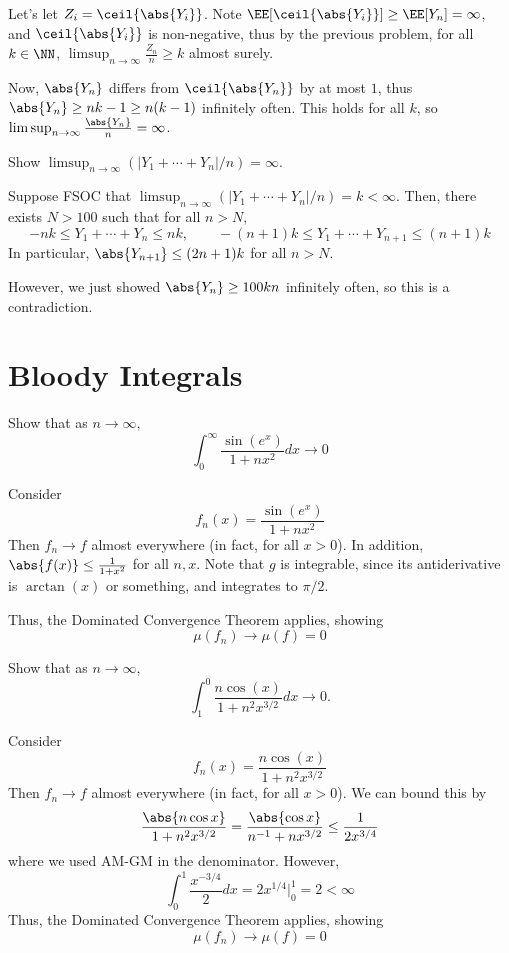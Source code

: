 \documentclass[11pt, headheight=30pt]{scrartcl}
\begin{document}
Let's let $Z_i = \ceil{\abs{Y_i}}$. Note $\EE[\ceil{\abs{Y_i}}] \geq \EE[Y_n] = \infty$,
and $\ceil{\abs{Y_i}}$ is non-negative, thus by the previous problem,
for all $k\in \NN$,
$\limsup_{n\to \infty} \frac{Z_n}{n} \geq k$
almost surely.

Now, $\abs{Y_n}$ differs from $\ceil{\abs{Y_n}}$
by at most $1$, thus $\abs{Y_n}\geq nk - 1\geq n(k-1)$ infinitely often.
This holds for all $k$, so $\limsup_{n\to \infty} \frac{\abs{Y_n}}{n} = \infty$.

\begin{prob}
    Show $\limsup_{n \to \infty}(|Y_1 + \cdots + Y_n|/n) = \infty$.
\end{prob}

Suppose FSOC that $\limsup_{n \to \infty}(|Y_1 + \cdots + Y_n|/n) = k < \infty$.
Then, there exists $N > 100$ such that for all $n > N$,
\[
    -nk \leq Y_1 + \cdots + Y_n \leq nk,\qquad -(n+1)k \leq Y_1 + \cdots + Y_{n+1} \leq (n+1)k
\]
In particular, $\abs{Y_{n+1}} \leq (2n + 1)k$ for all $n > N$.

However, we just showed $\abs{Y_n}\geq 100kn$ infinitely often,
so this is a contradiction.

\section{Bloody Integrals}
\begin{prob}
    Show that as $n \to \infty$,
    \[
        \int_0^\infty \frac{\sin(e^x)}{1 + nx^2}dx \to 0
    \]
\end{prob}

Consider
\[
    f_n(x) = \frac{\sin(e^x)}{1 + nx^2}
\]
Then $f_n\to f$ almost everywhere (in fact, for all $x > 0$).
In addition, $\abs{f(x)} \leq \frac{1}{1 + x^2}$ for all $n,x$.
Note that $g$ is integrable, since its antiderivative
is $\arctan(x)$ or something, and integrates to $\pi/2$.

Thus, the Dominated Convergence Theorem applies, showing
\[
    \mu(f_n) \to \mu(f) = 0    
\]

\begin{prob}
    Show that as $n \to \infty$,
    \[
        \int_1^0 \frac{n \cos(x)}{1 + n^2x^{3/2}}dx \to 0.    
    \]
\end{prob}

Consider
\[
    f_n(x) = \frac{n \cos(x)}{1 + n^2x^{3/2}}
\]
Then $f_n\to f$ almost everywhere (in fact, for all $x > 0$).
We can bound this by
\[
    \frac{\abs{n\cos x}}{1 + n^2x^{3/2}} = \frac{\abs{\cos x}}{n^{-1} + nx^{3/2}} \leq \frac{1}{2x^{3/4}}
\]
where we used AM-GM in the denominator. However,
\[
    \int_0^1 \frac{x^{-3/4}}{2}dx = 2x^{1/4}\bigg|_0^1 = 2 < \infty
\]
Thus, the Dominated Convergence Theorem applies, showing
\[
    \mu(f_n) \to \mu(f) = 0
\]
\end{document}
